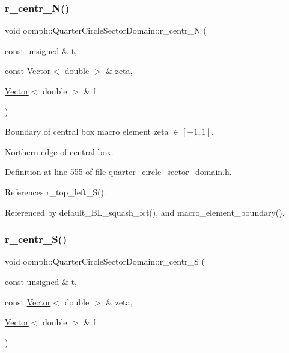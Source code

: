 \subsubsection{\texorpdfstring{r\+\_\+centr\+\_\+\+N()}{r\_centr\_N()}}
{\footnotesize\ttfamily void oomph\+::\+Quarter\+Circle\+Sector\+Domain\+::r\+\_\+centr\+\_\+N (\begin{DoxyParamCaption}\item[{const unsigned \&}]{t,  }\item[{const \hyperlink{classoomph_1_1Vector}{Vector}$<$ double $>$ \&}]{zeta,  }\item[{\hyperlink{classoomph_1_1Vector}{Vector}$<$ double $>$ \&}]{f }\end{DoxyParamCaption})\hspace{0.3cm}{\ttfamily [private]}}



Boundary of central box macro element zeta $ \in [-1,1] $. 

Northern edge of central box. 

Definition at line 555 of file quarter\+\_\+circle\+\_\+sector\+\_\+domain.\+h.



References r\+\_\+top\+\_\+left\+\_\+\+S().



Referenced by default\+\_\+\+B\+L\+\_\+squash\+\_\+fct(), and macro\+\_\+element\+\_\+boundary().

\mbox{\label{classoomph_1_1QuarterCircleSectorDomain_aaa17ff1d6529000f8309005396966830}} 
\subsubsection{\texorpdfstring{r\+\_\+centr\+\_\+\+S()}{r\_centr\_S()}}
{\footnotesize\ttfamily void oomph\+::\+Quarter\+Circle\+Sector\+Domain\+::r\+\_\+centr\+\_\+S (\begin{DoxyParamCaption}\item[{const unsigned \&}]{t,  }\item[{const \hyperlink{classoomph_1_1Vector}{Vector}$<$ double $>$ \&}]{zeta,  }\item[{\hyperlink{classoomph_1_1Vector}{Vector}$<$ double $>$ \&}]{f }\end{DoxyParamCaption})\hspace{0.3cm}{\ttfamily [private]}}



